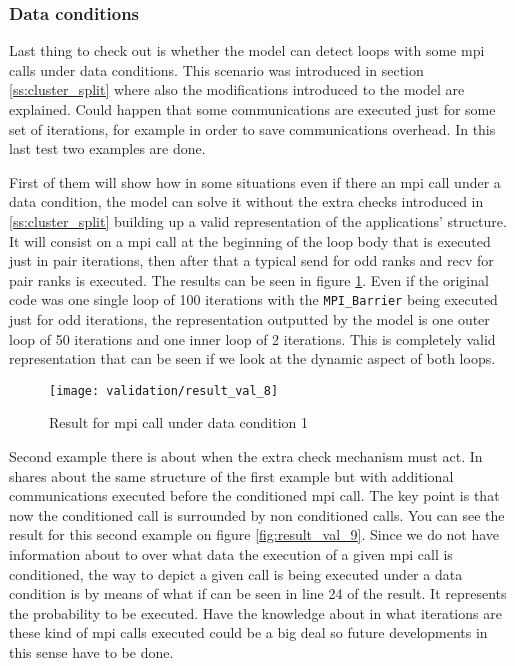 \subsubsection{Data conditions}

Last thing to check out is whether the model can detect loops with some mpi calls
under data conditions. This scenario was introduced in section
\ref{ss:cluster_split} where also the modifications introduced to the model are
explained. Could happen that some communications are executed just for some set
of iterations, for example in order to save communications overhead. In this
last test two examples are done. 

First of them will show how in some situations
even if there an mpi call under a data condition, the model can solve it without
the extra checks introduced in \ref{ss:cluster_split} building up a valid
representation of the applications' structure. It will consist on a mpi call at
the beginning of the loop body that is executed just in pair iterations, then
after that a typical send for odd ranks and recv for pair ranks is executed. The
results can be seen in figure \ref{fig:result_val_8}. Even if the original code
was one single loop of 100 iterations with the \texttt{MPI\_Barrier} being
executed just for odd iterations, the representation outputted by the model is 
one outer loop of 50 iterations and one inner loop of 2 iterations. This is
completely valid representation that can be seen if we look at the dynamic
aspect of both loops. 

\begin{figure}[H]
    \centering
    \texttt{[image: validation/result\_val\_8]}
    \caption{Result for mpi call under data condition 1}
    \label{fig:result_val_8}
\end{figure}

Second example there is about when the extra check mechanism must act. In shares
about the same structure of the first example but with additional communications
executed before the conditioned mpi call. The key point is that now the
conditioned call is surrounded by non conditioned calls. You can see the result
for this second example on figure \ref{fig:result_val_9}. Since we do not have
information about to over what data the execution of a given mpi call is
conditioned, the way to depict a given call is being executed under a data
condition is by means of what if can be seen in line 24 of the result. It
represents the probability to be executed. Have the knowledge about in what
iterations are these kind of mpi calls executed could be a big deal so future
developments in this sense have to be done.

